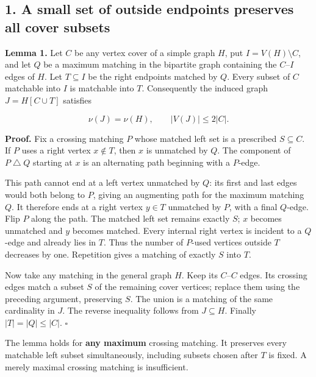 \hypertarget{af-e51d4b9b02-a-small-set-of-outside-endpoints-preserves-all-cover-subsets}{%
\subsection{1. A small set of outside endpoints preserves all cover subsets}\label{af-e51d4b9b02-a-small-set-of-outside-endpoints-preserves-all-cover-subsets}}

\textbf{Lemma 1.} Let \(C\) be any vertex cover of a simple graph \(H\), put \(I=V(H)\setminus C\), and let \(Q\) be a maximum matching in the bipartite graph containing the \(C\)--\(I\) edges of \(H\). Let \(T\subseteq I\) be the right endpoints matched by \(Q\). Every subset of \(C\) matchable into \(I\) is matchable into \(T\). Consequently the induced graph \(J=H[C\cup T]\) satisfies

\[
\nu(J)=\nu(H),\qquad |V(J)|\leq 2|C|.
\]

\textbf{Proof.} Fix a crossing matching \(P\) whose matched left set is a prescribed \(S\subseteq C\). If \(P\) uses a right vertex \(x\notin T\), then \(x\) is unmatched by \(Q\). The component of \(P\mathbin{\triangle}Q\) starting at \(x\) is an alternating path beginning with a \(P\)-edge.

This path cannot end at a left vertex unmatched by \(Q\): its first and last edges would both belong to \(P\), giving an augmenting path for the maximum matching \(Q\). It therefore ends at a right vertex \(y\in T\) unmatched by \(P\), with a final \(Q\)-edge. Flip \(P\) along the path. The matched left set remains exactly \(S\); \(x\) becomes unmatched and \(y\) becomes matched. Every internal right vertex is incident to a \(Q\)-edge and already lies in \(T\). Thus the number of \(P\)-used vertices outside \(T\) decreases by one. Repetition gives a matching of exactly \(S\) into \(T\).

Now take any matching in the general graph \(H\). Keep its \(C\)--\(C\) edges. Its crossing edges match a subset \(S\) of the remaining cover vertices; replace them using the preceding argument, preserving \(S\). The union is a matching of the same cardinality in \(J\). The reverse inequality follows from \(J\subseteq H\). Finally \(|T|=|Q|\leq|C|\). \hfill\(\square\)

The lemma holds for \textbf{any maximum} crossing matching. It preserves every matchable left subset simultaneously, including subsets chosen after \(T\) is fixed. A merely maximal crossing matching is insufficient.

